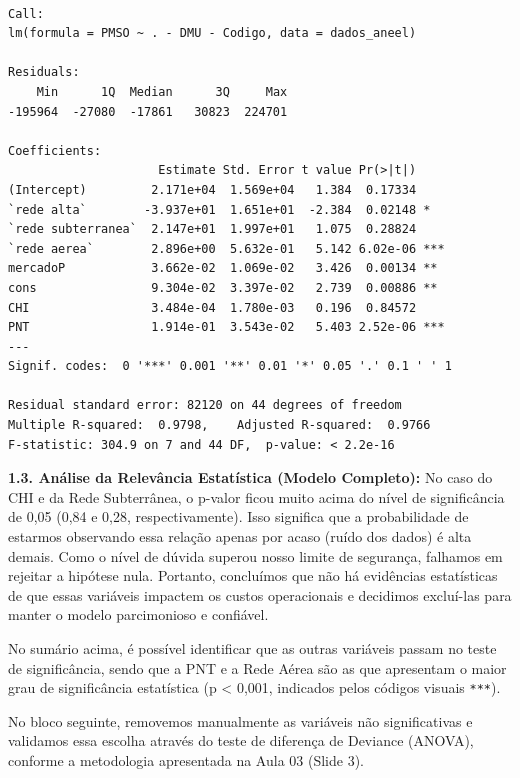 \documentclass[
  letterpaper,
]{article}
\begin{document}
\begin{verbatim}

Call:
lm(formula = PMSO ~ . - DMU - Codigo, data = dados_aneel)

Residuals:
    Min      1Q  Median      3Q     Max 
-195964  -27080  -17861   30823  224701 

Coefficients:
                     Estimate Std. Error t value Pr(>|t|)    
(Intercept)         2.171e+04  1.569e+04   1.384  0.17334    
`rede alta`        -3.937e+01  1.651e+01  -2.384  0.02148 *  
`rede subterranea`  2.147e+01  1.997e+01   1.075  0.28824    
`rede aerea`        2.896e+00  5.632e-01   5.142 6.02e-06 ***
mercadoP            3.662e-02  1.069e-02   3.426  0.00134 ** 
cons                9.304e-02  3.397e-02   2.739  0.00886 ** 
CHI                 3.484e-04  1.780e-03   0.196  0.84572    
PNT                 1.914e-01  3.543e-02   5.403 2.52e-06 ***
---
Signif. codes:  0 '***' 0.001 '**' 0.01 '*' 0.05 '.' 0.1 ' ' 1

Residual standard error: 82120 on 44 degrees of freedom
Multiple R-squared:  0.9798,    Adjusted R-squared:  0.9766 
F-statistic: 304.9 on 7 and 44 DF,  p-value: < 2.2e-16
\end{verbatim}

\textbf{1.3. Análise da Relevância Estatística (Modelo Completo):} No
caso do CHI e da Rede Subterrânea, o p-valor ficou muito acima do nível
de significância de 0,05 (0,84 e 0,28, respectivamente). Isso significa
que a probabilidade de estarmos observando essa relação apenas por acaso
(ruído dos dados) é alta demais. Como o nível de dúvida superou nosso
limite de segurança, falhamos em rejeitar a hipótese nula. Portanto,
concluímos que não há evidências estatísticas de que essas variáveis
impactem os custos operacionais e decidimos excluí-las para manter o
modelo parcimonioso e confiável.

No sumário acima, é possível identificar que as outras variáveis passam
no teste de significância, sendo que a PNT e a Rede Aérea são as que
apresentam o maior grau de significância estatística (p \textless{}
0,001, indicados pelos códigos visuais \texttt{***}).

No bloco seguinte, removemos manualmente as variáveis não significativas
e validamos essa escolha através do teste de diferença de Deviance
(ANOVA), conforme a metodologia apresentada na Aula 03 (Slide 3).
\end{document}
